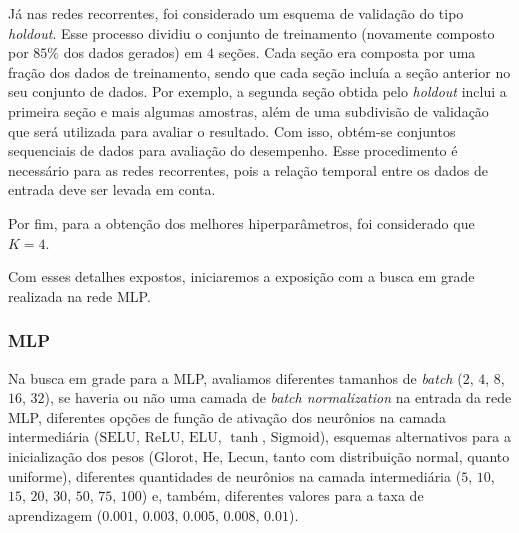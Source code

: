 \documentclass[a4paper, 12pt]{article}
\newcommand{\sigmoid}{\text{Sigmoid}}
\newcommand{\selu}{\text{SELU}}
\newcommand{\relu}{\text{ReLU}}
\newcommand{\elu}{\text{ELU}}
\newcommand{\lecun}{\text{Lecun}}
\newcommand{\he}{\text{He}}
\newcommand{\glorot}{\text{Glorot}}
\begin{document}
Já nas redes recorrentes, foi considerado um esquema de validação do tipo \textit{holdout}. Esse processo dividiu o conjunto de treinamento (novamente composto por $85\%$ dos dados gerados) em $4$ seções. Cada seção era composta por uma fração dos dados de treinamento, sendo que cada seção incluía a seção anterior no seu conjunto de dados. Por exemplo, a segunda seção obtida pelo \textit{holdout} inclui a primeira seção e mais algumas amostras, além de uma subdivisão de validação que será utilizada para avaliar o resultado. Com isso, obtém-se conjuntos sequenciais de dados para avaliação do desempenho. Esse procedimento é necessário para as redes recorrentes, pois a relação temporal entre os dados de entrada deve ser levada em conta.

Por fim, para a obtenção dos melhores hiperparâmetros, foi considerado que $K = 4$. 

Com esses detalhes expostos, iniciaremos a exposição com a busca em grade realizada na rede MLP.

\subsubsection{MLP}

Na busca em grade para a MLP, avaliamos diferentes tamanhos de \textit{batch} ($2$, $4$, $8$, $16$, $32$), se haveria ou não uma camada de \textit{batch normalization} na entrada da rede MLP, diferentes opções de função de ativação dos neurônios na camada intermediária ($\selu$, $\relu$, $\elu$, $\tanh$, $\sigmoid$), esquemas alternativos para a inicialização dos pesos ($\glorot$, $\he$, $\lecun$, tanto com distribuição normal, quanto uniforme), diferentes quantidades de neurônios na camada intermediária ($5$, $10$, $15$, $20$, $30$, $50$, $75$, $100$) e, também, diferentes valores para a taxa de aprendizagem ($0.001$, $0.003$, $0.005$, $0.008$, $0.01$). 
\end{document}

